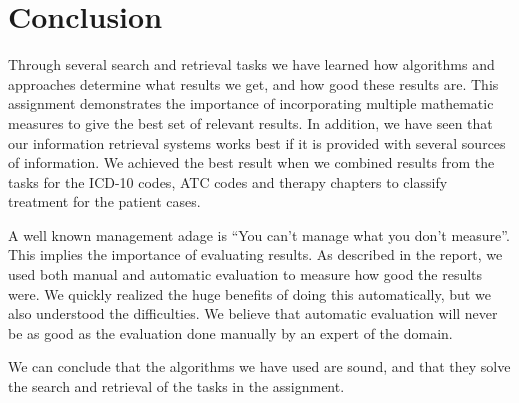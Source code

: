 \chapter{Conclusion}
\label{cha:conclusion}
Through several search and retrieval tasks we have learned how algorithms and approaches determine what results we get, and how good these results are. This assignment demonstrates the importance of incorporating multiple mathematic measures to give the best set of relevant results. In addition, we have seen that our information retrieval systems works best if it is provided with several sources of information. We achieved the best result when we combined results from the tasks for the ICD-10 codes, ATC codes and therapy chapters to classify treatment for the patient cases.

A well known management adage is ``You can't manage what you don't measure''. This implies the importance of evaluating results. As described in the report, we used both manual and automatic evaluation to measure how good the results were. We quickly realized the huge benefits of doing this automatically, but we also understood the difficulties. We believe that automatic evaluation will never be as good as the evaluation done manually by an expert of the domain. 

We can conclude that the algorithms we have used are sound, and that they solve the search and retrieval of the tasks in the assignment. 